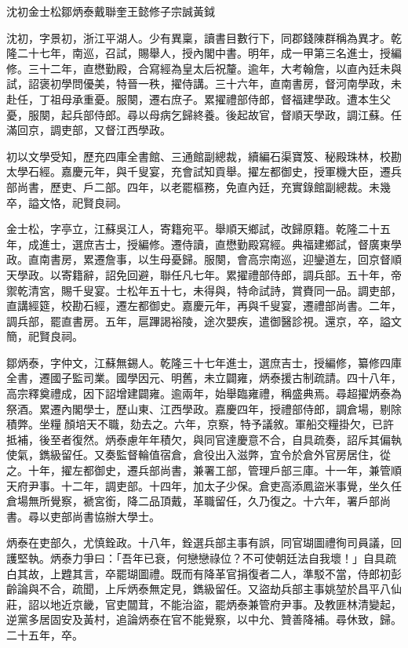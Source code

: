 
\begin{pinyinscope}
沈初金士松鄒炳泰戴聯奎王懿修子宗誠黃鉞

沈初，字景初，浙江平湖人。少有異稟，讀書目數行下，同郡錢陳群稱為異才。乾隆二十七年，南巡，召試，賜舉人，授內閣中書。明年，成一甲第三名進士，授編修。三十二年，直懋勤殿，合寫經為皇太后祝釐。逾年，大考翰詹，以直內廷未與試，詔褒初學問優美，特晉一秩，擢侍講。三十六年，直南書房，督河南學政，未赴任，丁祖母承重憂。服闋，遷右庶子。累擢禮部侍郎，督福建學政。遭本生父憂，服闋，起兵部侍郎。尋以母病乞歸終養。後起故官，督順天學政，調江蘇。任滿回京，調吏部，又督江西學政。

初以文學受知，歷充四庫全書館、三通館副總裁，續編石渠寶笈、秘殿珠林，校勘太學石經。嘉慶元年，與千叟宴，充會試知貢舉。擢左都御史，授軍機大臣，遷兵部尚書，歷吏、戶二部。四年，以老罷樞務，免直內廷，充實錄館副總裁。未幾卒，謚文恪，祀賢良祠。

金士松，字亭立，江蘇吳江人，寄籍宛平。舉順天鄉試，改歸原籍。乾隆二十五年，成進士，選庶吉士，授編修。遷侍讀，直懋勤殿寫經。典福建鄉試，督廣東學政。直南書房，累遷詹事，以生母憂歸。服闋，會高宗南巡，迎鑾道左，回京督順天學政。以寄籍辭，詔免回避，聯任凡七年。累擢禮部侍郎，調兵部。五十年，帝禦乾清宮，賜千叟宴。士松年五十七，未得與，特命試詩，賞賚同一品。調吏部，直講經筵，校勘石經，遷左都御史。嘉慶元年，再與千叟宴，遷禮部尚書。二年，調兵部，罷直書房。五年，扈蹕謁裕陵，途次嬰疾，遣御醫診視。還京，卒，謚文簡，祀賢良祠。

鄒炳泰，字仲文，江蘇無錫人。乾隆三十七年進士，選庶吉士，授編修，纂修四庫全書，遷國子監司業。國學因元、明舊，未立闢雍，炳泰援古制疏請。四十八年，高宗釋奠禮成，因下詔增建闢雍。逾兩年，始舉臨雍禮，稱盛典焉。尋超擢炳泰為祭酒。累遷內閣學士，歷山東、江西學政。嘉慶四年，授禮部侍郎，調倉場，剔除積弊。坐糧顏培天不職，劾去之。六年，京察，特予議敘。軍船交糧掛欠，已許抵補，後至者復然。炳泰慮年年積欠，與同官達慶意不合，自具疏奏，詔斥其偏執使氣，鐫級留任。又奏監督輪值宿倉，倉役出入滋弊，宜令於倉外官房居住，從之。十年，擢左都御史，遷兵部尚書，兼署工部，管理戶部三庫。十一年，兼管順天府尹事。十二年，調吏部。十四年，加太子少保。倉吏高添鳳盜米事覺，坐久任倉場無所覺察，褫宮銜，降二品頂戴，革職留任，久乃復之。十六年，署戶部尚書。尋以吏部尚書協辦大學士。

炳泰在吏部久，尤慎銓政。十八年，銓選兵部主事有誤，同官瑚圖禮徇司員議，回護堅執。炳泰力爭曰：「吾年已衰，何戀戀祿位？不可使朝廷法自我壞！」自具疏白其故，上韙其言，卒罷瑚圖禮。既而有降革官捐復者二人，準駁不當，侍郎初彭齡論與不合，疏聞，上斥炳泰無定見，鐫級留任。又盜劫兵部主事姚堃於昌平八仙莊，詔以地近京畿，官吏闒茸，不能治盜，罷炳泰兼管府尹事。及教匪林清變起，逆黨多居固安及黃村，追論炳泰在官不能覺察，以中允、贊善降補。尋休致，歸。二十五年，卒。


\end{pinyinscope}
